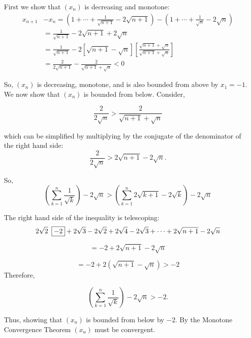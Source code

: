 \documentclass{report}
\begin{document}
\begin{myproof}
  First we show that $(x_n)$ is decreasing and monotone:
$$
\begin{aligned}
  x_{n+1} & -x_n=\left(1+\cdots+\frac{1}{\sqrt{n+1}}-2 \sqrt{n+1}\right)-\left(1+\cdots+\frac{1}{\sqrt{n}} - 2 \sqrt{n}\right) \\
& =\frac{1}{\sqrt{n+1}}-2 \sqrt{n+1}+2 \sqrt{n} \\
& =\frac{1}{\sqrt{n+1}}-2[\sqrt{n+1}-\sqrt{n}]\left[\frac{\sqrt{n+1}+\sqrt{n}}{\sqrt{n+1}+\sqrt{n}}\right] \\
& =\frac{2}{2\sqrt{n+1}}-\frac{2}{\sqrt{n+1}+\sqrt{n}}<0
\end{aligned}
$$

So, $\left(x_n\right)$ is decreasing, monotone, and is also bounded from above by $x_1 =-1.$
We now show that $(x_n)$ is bounded from below. Consider,

$$\frac{2}{2 \sqrt{n}} > \frac{2}{\sqrt{n+1} + \sqrt{n}}$$

which can be simplified by multiplying by the conjugate of the denominator of the right hand side:
 $$\frac{2}{2 \sqrt{n}} > 2\sqrt{n+1} - 2\sqrt{n}.$$
 

 So,
 $$
\left(\sum_{k=1}^{n} \frac{1}{\sqrt{k}} \right)-2 \sqrt{n} > \left( \sum_{k=1}^{n} 2\sqrt{k+1} - 2\sqrt{k} \right) - 2\sqrt{n}
 $$

The right hand side of the inequality is telescoping:
 $$
 2\sqrt{2} \hspace{0.5em}\boxed{-2} + 2\sqrt{3}- 2\sqrt{2} + 2\sqrt{4} - 2\sqrt{3}+ \cdots + 2\sqrt{n+1} - 2\sqrt{n}
$$

 $$
 = -2  + 2\sqrt{n+1}- 2\sqrt{n}
$$

 $$
 = -2  + 2(\sqrt{n+1}- \sqrt{n}) > -2
$$
Therefore,

$$\left(\sum_{k=1}^{n} \frac{1}{\sqrt{k}} \right)-2 \sqrt{n} > -2.$$

Thus, showing that $(x_n)$ is bounded from below by $-2$. By the Monotone Convergence Theorem $(x_n)$ must be convergent.

\end{myproof}
\pagebreak
{}
\end{document}
